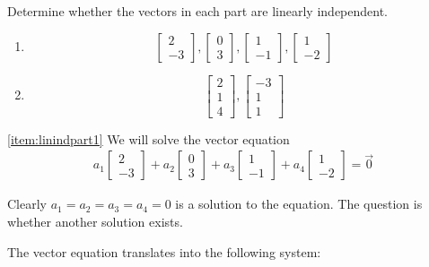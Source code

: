 \documentclass{ximera}
\begin{document}
\begin{example}\label{ex:linind}Determine whether the vectors in each part are linearly independent.

\begin{enumerate}
\item \label{item:linindpart1}
$$\begin{bmatrix}2\\-3\end{bmatrix}, \begin{bmatrix}0\\3\end{bmatrix},\begin{bmatrix}1\\-1\end{bmatrix},\begin{bmatrix}1\\-2\end{bmatrix}$$

\item \label{item:linindpart2} $$\begin{bmatrix}2\\1\\4\end{bmatrix},\begin{bmatrix}-3\\1\\1\end{bmatrix}$$
\end{enumerate}
\begin{explanation} \ref{item:linindpart1}
We will solve the vector equation
\begin{align}\label{eq:linrelationpart1}a_1\begin{bmatrix}2\\-3\end{bmatrix}+a_2 \begin{bmatrix}0\\3\end{bmatrix}+a_3\begin{bmatrix}1\\-1\end{bmatrix}+a_4\begin{bmatrix}1\\-2\end{bmatrix}=\vec{0}\end{align}
 
 Clearly $a_1=a_2=a_3=a_4=0$ is a solution to the equation.  The question is whether another solution exists.
 
The vector equation translates into the following system:


\end{explanation}
\end{example}
\end{document}
